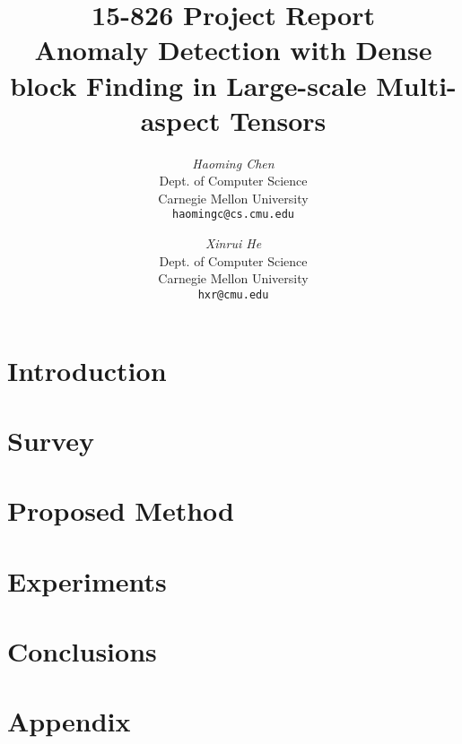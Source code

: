 \documentclass[12pt]{article}
\begin{document}
\newcommand{\beq}{\begin{equation}}
\newcommand{\eeq}{\end{equation}}
\newcommand{\bit}{\begin{itemize*}}
\newcommand{\eit}{\end{itemize*}}
\newcommand{\goal}[1]{ {\noindent {$\Rightarrow$} \em {#1} } }
\newcommand{\hide}[1]{}
\newcommand{\comment}[1]{ {\footnotesize {#1} } }
\newtheorem{lemma}{Lemma}
\newtheorem{theorem}{Theorem}
\newtheorem{proof}{Proof}
\newtheorem{defn}{Definition}
\newtheorem{algo}{Algorithm}
\newtheorem{observation}{Observation}

\title{15-826 Project Report \\
        Anomaly Detection with Dense block Finding in Large-scale Multi-aspect Tensors}


\author{ {\em Haoming Chen} \\
	    Dept. of Computer Science \\
	    Carnegie Mellon University\\
	    {\tt haomingc@cs.cmu.edu}
	 \and
	 {\em Xinrui He} \\
	     Dept. of Computer Science \\
	     Carnegie Mellon University\\
	     {\tt hxr@cmu.edu}
        }


\maketitle
 \begin{abstract}
     
 \end{abstract}

 \section{Introduction}
     \label{sec:intro}
     

\section{Survey}
    \label{sec:survey}
    

 \section{Proposed Method}
     \label{sec:proposed}
     


 \section{Experiments}
     \label{sec:experiments}
     

 \section{Conclusions}
     \label{sec:conclusions}
     

\newpage



 \newpage
 \appendix
 \section{Appendix}
 

\end{document}

